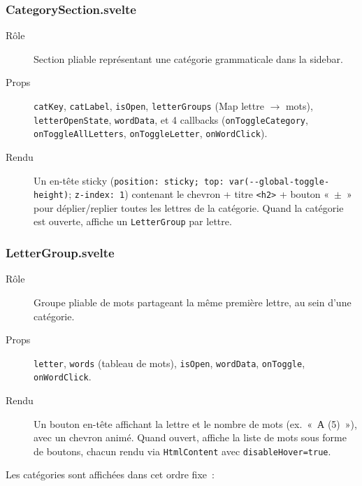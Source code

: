 \subsubsection{CategorySection.svelte}

\begin{description}
  \item[Rôle] Section pliable représentant une catégorie grammaticale dans la sidebar.
  \item[Props] \texttt{catKey}, \texttt{catLabel}, \texttt{isOpen}, \texttt{letterGroups} (Map lettre $\rightarrow$ mots), \texttt{letterOpenState}, \texttt{wordData}, et 4 callbacks (\texttt{onToggleCategory}, \texttt{onToggleAllLetters}, \texttt{onToggleLetter}, \texttt{onWordClick}).
  \item[Rendu] Un en-tête sticky (\texttt{position: sticky; top: var({-}{-}global-toggle-height)}; \texttt{z-index: 1}) contenant le chevron + titre \texttt{<h2>} + bouton «~$\pm$~» pour déplier/replier toutes les lettres de la catégorie. Quand la catégorie est ouverte, affiche un \texttt{LetterGroup} par lettre.
\end{description}

\subsubsection{LetterGroup.svelte}

\begin{description}
  \item[Rôle] Groupe pliable de mots partageant la même première lettre, au sein d'une catégorie.
  \item[Props] \texttt{letter}, \texttt{words} (tableau de mots), \texttt{isOpen}, \texttt{wordData}, \texttt{onToggle}, \texttt{onWordClick}.
  \item[Rendu] Un bouton en-tête affichant la lettre et le nombre de mots (ex.~«~А (5)~»), avec un chevron animé. Quand ouvert, affiche la liste de mots sous forme de boutons, chacun rendu via \texttt{HtmlContent} avec \texttt{disableHover=true}.
\end{description}

Les catégories sont affichées dans cet ordre fixe~:

